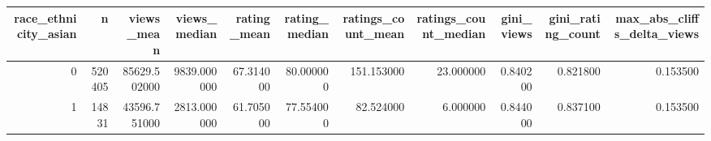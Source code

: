 \begin{tabular}{rrrrrrrrrrr}
\toprule
race_ethnicity_asian & n & views_mean & views_median & rating_mean & rating_median & ratings_count_mean & ratings_count_median & gini_views & gini_rating_count & max_abs_cliffs_delta_views \\
\midrule
0 & 520405 & 85629.502000 & 9839.000000 & 67.314000 & 80.000000 & 151.153000 & 23.000000 & 0.840200 & 0.821800 & 0.153500 \\
1 & 14831 & 43596.751000 & 2813.000000 & 61.705000 & 77.554000 & 82.524000 & 6.000000 & 0.844000 & 0.837100 & 0.153500 \\
\bottomrule
\end{tabular}
